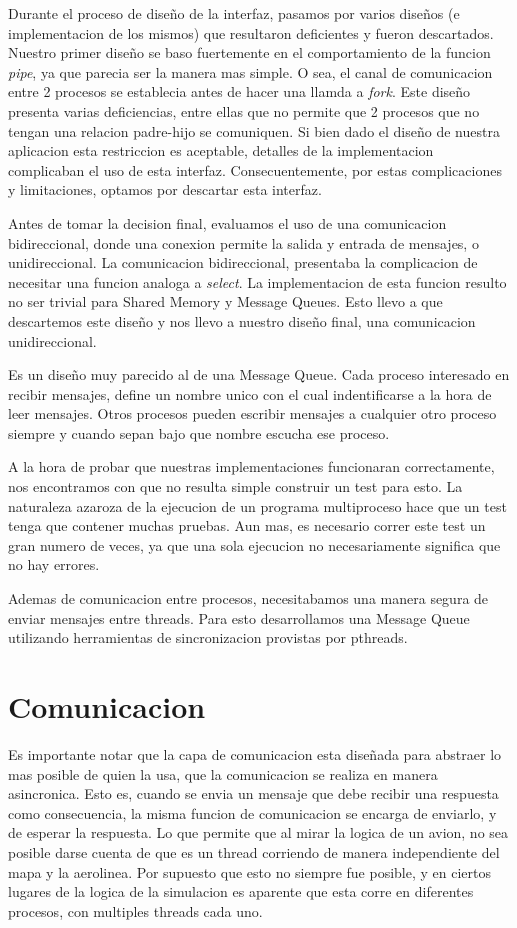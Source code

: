 \documentclass[a4paper,10pt]{article}
\begin{document}
Durante el proceso de diseño de la interfaz, pasamos por varios diseños (e implementacion de los mismos) que resultaron deficientes y fueron descartados.
Nuestro primer diseño se baso fuertemente en el comportamiento de la funcion \textit{pipe}, ya que parecia ser la manera mas simple.
O sea, el canal de comunicacion entre 2 procesos se establecia antes de hacer una llamda a \textit{fork}.
Este diseño presenta varias deficiencias, entre ellas que no permite que 2 procesos que no tengan una relacion padre-hijo se comuniquen.
Si bien dado el diseño de nuestra aplicacion esta restriccion es aceptable, detalles de la implementacion complicaban el uso de esta interfaz.
Consecuentemente, por estas complicaciones y limitaciones, optamos por descartar esta interfaz.

Antes de tomar la decision final, evaluamos el uso de una comunicacion bidireccional, donde una conexion permite la salida y entrada de mensajes, o unidireccional.
La comunicacion bidireccional, presentaba la complicacion de necesitar una funcion analoga a \textit{select}.
La implementacion de esta funcion resulto no ser trivial para Shared Memory y Message Queues.
Esto llevo a que descartemos este diseño y nos llevo a nuestro diseño final, una comunicacion unidireccional.

Es un diseño muy parecido al de una Message Queue.
Cada proceso interesado en recibir mensajes, define un nombre unico con el cual indentificarse a la hora de leer mensajes.
Otros procesos pueden escribir mensajes a cualquier otro proceso siempre y cuando sepan bajo que nombre escucha ese proceso.

A la hora de probar que nuestras implementaciones funcionaran correctamente, nos encontramos con que no resulta simple construir un test para esto.
La naturaleza azaroza de la ejecucion de un programa multiproceso hace que un test tenga que contener muchas pruebas.
Aun mas, es necesario correr este test un gran numero de veces, ya que una sola ejecucion no necesariamente significa que no hay errores.

Ademas de comunicacion entre procesos, necesitabamos una manera segura de enviar mensajes entre threads.
Para esto desarrollamos una Message Queue utilizando herramientas de sincronizacion provistas por pthreads.

\newpage
\section{Comunicacion}
Es importante notar que la capa de comunicacion esta diseñada para abstraer lo mas posible de quien la usa, que la comunicacion se realiza en manera asincronica.
Esto es, cuando se envia un mensaje que debe recibir una respuesta como consecuencia, la misma funcion de comunicacion se encarga de enviarlo, y de esperar la respuesta.
Lo que permite que al mirar la logica de un avion, no sea posible darse cuenta de que es un thread corriendo de manera independiente del mapa y la aerolinea.
Por supuesto que esto no siempre fue posible, y en ciertos lugares de la logica de la simulacion es aparente que esta corre en diferentes procesos, con multiples threads cada uno.
\end{document}
